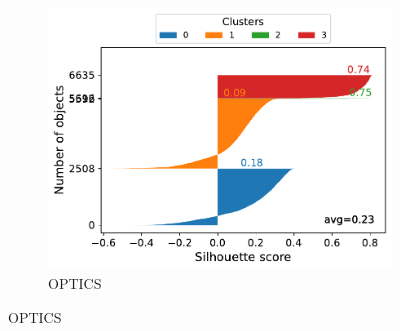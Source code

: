 \documentclass[10pt, a4paper, twocolumn]{article}
\begin{document}
\begin{figure}[t]
\begin{subfigure}[t]{0.196\textwidth}
        \includegraphics[width=\linewidth]{immagini simone/optics_silh.pdf}
        \caption{OPTICS}
        \label{fig:optics_silh}
    \end{subfigure}


\end{figure}
\end{document}
